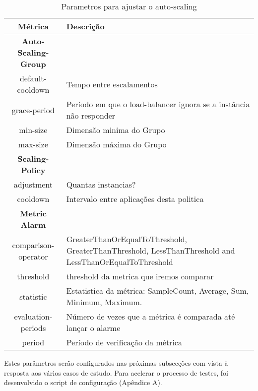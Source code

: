 \begin{table}[ht]
\centering
\begin{tabular}{| c | p{10cm} |}
    \hline
    {\bf Métrica } & {\bf Descrição }  \\ \hline\hline
    {\bf Auto-Scaling-Group} &  \\ \hline
	 default-cooldown & Tempo entre escalamentos \\ \hline
	 grace-period &  Período em que o load-balancer ignora se a instância não responder\\ \hline

	min-size &  Dimensão minima do Grupo \\ \hline
	max-size &  Dimensão máxima do Grupo \\ \hline\hline
	
	{\bf Scaling-Policy } &  \\ \hline
	 adjustment &  Quantas instancias? \\ \hline
	 cooldown &  Intervalo entre aplicações desta politica \\ \hline\hline
	{\bf Metric Alarm } &  \\ \hline
	 comparison-operator  &  GreaterThanOrEqualToThreshold,  GreaterThanThreshold, 
       LessThanThreshold and LessThanOrEqualToThreshold \\ \hline
	threshold &  threshold da metrica que iremos comparar\\ \hline
	 statistic &  Estatistica da métrica: SampleCount, Average, Sum, Minimum, Maximum. \\ \hline
	evaluation-periods  &  Número de vezes que a métrica é comparada até lançar o alarme \\ \hline
period  &   Período de verificação da métrica\\ \hline
    \hline
  \end{tabular}
\caption{Parametros para ajustar o auto-scaling}
\label{table:Parametros} %
\end{table}

Estes parâmetros serão configurados nas próximas subsecções com vista à resposta aos vários casos de estudo. Para acelerar o processo de testes, foi desenvolvido o script de configuração (Apêndice A).


